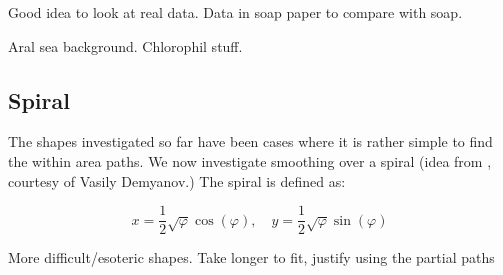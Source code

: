\documentclass[a4paper,10pt]{article}
\renewcommand{\phi}{\varphi}
\begin{document}
Good idea to look at real data. Data in soap paper to compare with soap.

Aral sea background. Chlorophil stuff.



\subsection{Spiral}

The shapes investigated so far have been cases where it is rather simple to find the within area paths. We now investigate smoothing over a spiral (idea from \cite{spiralpaper}, courtesy of Vasily Demyanov.) The spiral is defined as:

\begin{equation}
x=\frac{1}{2}\sqrt{\phi}\cos(\phi), \quad y=\frac{1}{2}\sqrt{\phi}\sin(\phi)
\end{equation}



More difficult/esoteric shapes. Take longer to fit, justify using the partial paths







\end{document}
